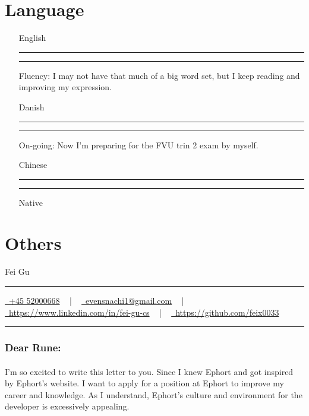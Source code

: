 \documentclass[a4paper]{article}
\makeatletter
\newcommand{\myName}{Fei Gu}
\newcommand{\email}{evensnachi1@gmail.com}
\newcommand{\tel}{+45 52000668}
\newcommand{\linkedin}{https://www.linkedin.com/in/fei-gu-cs}
\newcommand{\github}{https://github.com/feix0033}
\newcommand{\documentTitle}[2]{
\begin{center}
{\LARGE\color{accentSp} #1}
\vspace{10pt}
{\color{accentLine} \hrule}
\vspace{2pt}
\footnotesize{#2}
\vspace{2pt}
{\color{accentLine} \hrule}
\end{center}
}
\newcommand{\progressbar}[2][3cm]{%
\textcolor{accentLine}{\rule{#1 * \real{#2} / 100}{1.5ex}}%
\textcolor{accentLine!15}{\rule{#1 - #1 * \real{#2} / 100}{1.5ex}}}
\makeatother
\begin{document}

\vspace{2em}
\section{Language}

\begin{itemize}[itemsep=1px, parsep=1pt, leftmargin=2cm]
\item[English] \progressbar{70} Fluency: I may not have that much of a big word set, but I keep reading and improving my expression.
\item[Danish] \progressbar{40} On-going: Now I'm preparing for the FVU trin 2 exam by myself.
\item[Chinese] \progressbar{100} Native
\end{itemize}

\vspace{2em}
\section{Others}


\pagebreak




\documentTitle{\myName}{
\href{tel: \tel}{
	\raisebox{-0.05\height} \faPhone\ \tel} ~ | ~
\href{mailto:\email}{
	\raisebox{-0.15\height} \faEnvelope\ \email} ~ | ~
\href{\linkedin}{
	\raisebox{-0.15\height} \faLinkedin\ \linkedin} ~ | ~
\href{\github}{
	\raisebox{-0.15\height} \faGithub\ \github }
}

\subsubsection*{Dear Rune:}
\paragraph{}
I’m so excited to write this letter to you. Since I knew Ephort and got inspired by Ephort’s website. I want to apply for a position at Ephort to improve my career and knowledge. As I understand, Ephort’s culture and environment for the developer is excessively appealing.
\end{document}
